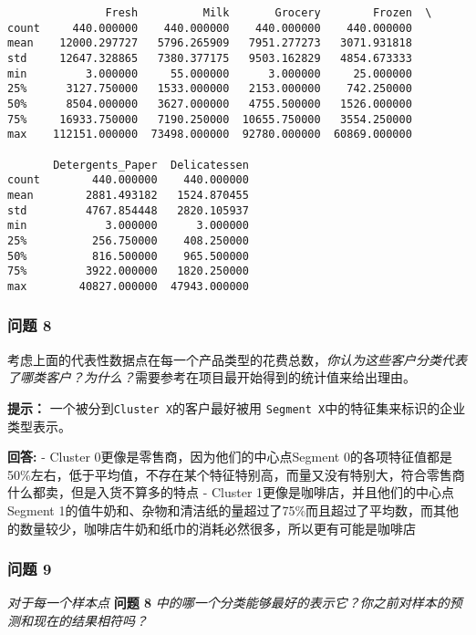 \documentclass[11pt]{article}
\begin{document}
    
    
    \begin{verbatim}
               Fresh          Milk       Grocery        Frozen  \
count     440.000000    440.000000    440.000000    440.000000   
mean    12000.297727   5796.265909   7951.277273   3071.931818   
std     12647.328865   7380.377175   9503.162829   4854.673333   
min         3.000000     55.000000      3.000000     25.000000   
25%      3127.750000   1533.000000   2153.000000    742.250000   
50%      8504.000000   3627.000000   4755.500000   1526.000000   
75%     16933.750000   7190.250000  10655.750000   3554.250000   
max    112151.000000  73498.000000  92780.000000  60869.000000   

       Detergents_Paper  Delicatessen  
count        440.000000    440.000000  
mean        2881.493182   1524.870455  
std         4767.854448   2820.105937  
min            3.000000      3.000000  
25%          256.750000    408.250000  
50%          816.500000    965.500000  
75%         3922.000000   1820.250000  
max        40827.000000  47943.000000  
    \end{verbatim}

    
    \subsubsection{问题 8}\label{ux95eeux9898-8}

考虑上面的代表性数据点在每一个产品类型的花费总数，\emph{你认为这些客户分类代表了哪类客户？为什么？}需要参考在项目最开始得到的统计值来给出理由。

\textbf{提示：}
一个被分到\texttt{\textquotesingle{}Cluster\ X\textquotesingle{}}的客户最好被用
\texttt{\textquotesingle{}Segment\ X\textquotesingle{}}中的特征集来标识的企业类型表示。

    \textbf{回答:} - Cluster 0更像是零售商，因为他们的中心点Segment
0的各项特征值都是50\%左右，低于平均值，不存在某个特征特别高，而量又没有特别大，符合零售商什么都卖，但是入货不算多的特点
- Cluster 1更像是咖啡店，并且他们的中心点Segment
1的值牛奶和、杂物和清洁纸的量超过了75\%而且超过了平均数，而其他的数量较少，咖啡店牛奶和纸巾的消耗必然很多，所以更有可能是咖啡店

    \subsubsection{问题 9}\label{ux95eeux9898-9}

\emph{对于每一个样本点 } \textbf{问题 8}
\emph{中的哪一个分类能够最好的表示它？你之前对样本的预测和现在的结果相符吗？}
\end{document}
